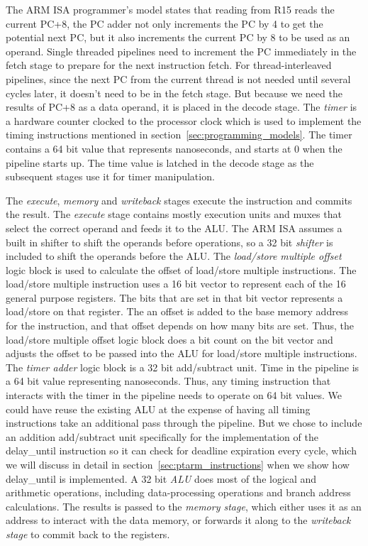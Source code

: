The ARM ISA programmer's model states that reading from R15 reads the current PC+8, the PC adder not only increments the PC by 4 to get the potential next PC, but it also increments the current PC by 8 to be used as an operand. 
Single threaded pipelines need to increment the PC immediately in the fetch stage to prepare for the next instruction fetch.  
For thread-interleaved pipelines, since the next PC from the current thread is not needed until several cycles later, it doesn't need to be in the fetch stage. 
But because we need the results of PC+8 as a data operand, it is placed in the decode stage. 
The \emph{timer} is a hardware counter clocked to the processor clock which is used to implement the timing instructions mentioned in section~\ref{sec:programming_models}.
The timer contains a 64 bit value that represents nanoseconds, and starts at 0 when the pipeline starts up.  
The time value is latched in the decode stage as the subsequent stages use it for timer manipulation.

The \emph{execute}, \emph{memory} and \emph{writeback} stages execute the instruction and commits the result. 
The \emph{execute} stage contains mostly execution units and muxes that select the correct operand and feeds it to the ALU.  
The ARM ISA assumes a built in shifter to shift the operands before operations, so a 32 bit \emph{shifter} is included to shift the operands before the ALU.   
The \emph{load/store multiple offset} logic block is used to calculate the offset of load/store multiple instructions.
The load/store multiple instruction uses a 16 bit vector to represent each of the 16 general purpose registers.
The bits that are set in that bit vector represents a load/store on that register.
The an offset is added to the base memory address for the instruction, and that offset depends on how many bits are set. 
Thus, the load/store multiple offset logic block does a bit count on the bit vector and adjusts the offset to be passed into the ALU for load/store multiple instructions.
The \emph{timer adder} logic block is a 32 bit add/subtract unit.
Time in the pipeline is a 64 bit value representing nanoseconds. 
Thus, any timing instruction that interacts with the timer in the pipeline needs to operate on 64 bit values.
We could have reuse the existing ALU at the expense of having all timing instructions take an additional pass through the pipeline.
But we chose to include an addition add/subtract unit specifically for the implementation of the delay\_until instruction so it can check for deadline expiration every cycle, which we will discuss in detail in section~\ref{sec:ptarm_instructions} when we show how delay\_until is implemented.    
A 32 bit \emph{ALU} does most of the logical and arithmetic operations, including data-processing operations and branch address calculations.
The results is passed to the \emph{memory stage}, which either uses it as an address to interact with the data memory, or forwards it along to the \emph{writeback stage} to commit back to the registers.

